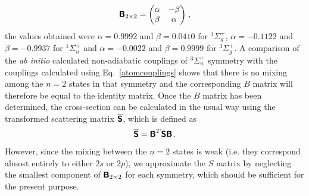 \documentclass[fleqn,usenatbib]{mnras}
\begin{document}
\begin{align}
\textbf{\textsf{B}}_{2\times 2} =
\begin{pmatrix}
\alpha & -\beta \\
\beta & \alpha
\end{pmatrix} \hspace{1 pt},
\end{align}
the values obtained were $\alpha = 0.9992$ and $\beta=0.0410$ for $^1\Sigma^+_g$, $\alpha =-0.1122$ and $\beta=-0.9937$ for $^1\Sigma^+_u$ and $\alpha =-0.0022$ and $\beta=0.9999$ for $^3\Sigma^+_g$. A comparison of the \textit{ab initio} calculated non-adiabatic couplings of $^3\Sigma^+_u$ symmetry with the couplings calculated using Eq.~\eqref{atomcouplings} shows that there is no mixing among the $n=2$ states in that symmetry and the corresponding $B$ matrix will therefore be equal to the identity matrix. Once the $B$ matrix has been determined, the cross-section can be calculated in the usual way using the transformed scattering matrix $\overline{\textbf{\textsf{S}}}$, which is defined as
\begin{align}
\overline{\textbf{\textsf{S}}} = \textbf{\textsf{B}}^T \textbf{\textsf{S}} \textbf{\textsf{B}}  \hspace{1 pt}.
\end{align}
However, since the mixing between the $n=2$ states is weak (i.e. they correspond almost entirely to either $2s$ or $2p$), we approximate the $S$ matrix by neglecting the smallest component of $\textbf{\textsf{B}}_{2\times 2}$ for each symmetry, which should be sufficient for the present purpose.



\label{lastpage}
\end{document}
